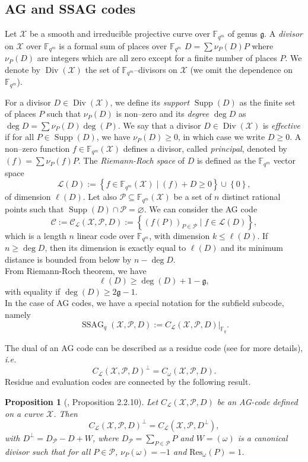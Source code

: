\documentclass[a4paper]{article}
\newtheorem{proposition}[thm]{Proposition}
\theoremstyle{definition}
\theoremstyle{remark}
\newcommand{\calP}{\mathcal{P}}
\newcommand{\calL}{\mathcal{L}}
\newcommand{\calC}{\mathcal{C}}
\newcommand{\calX}{\mathcal{X}}
\newcommand{\fqm}{\mathbb{F}_{q^m}}
\newcommand{\fq}{\mathbb{F}_{q}}
\newcommand{\set}[1]{\left\{#1\right\}}
\newcommand{\Supp}{\operatorname{Supp}}
\newcommand{\Div}{\operatorname{Div}}
\newcommand{\ssag}[1]{\operatorname{SSAG}_{q}\left(#1\right)}
\begin{document}
\subsection{AG and SSAG codes} \label{section:AG_codes}

Let $\calX$ be a smooth and irreducible projective curve over $\fqm$ of genus $\mathfrak{g}$. A \emph{divisor} on $\calX$ over $\fqm$ is a formal sum of places over $\fqm$ $D=\sum \nu_P(D) P$ where $\nu_P(D)$ are integers which are all zero except for a finite number of places $P$. We denote by $\Div(\calX)$ the set of $\fqm$--divisors on $\calX$ (we omit the dependence on $\fqm$).

For a divisor $D \in \Div(\calX)$, we define its \emph{support} $\Supp(D)$ as the finite set of places $P$ such that $\nu_P(D)$ is non--zero and its \emph{degree} $\deg D$ as $\deg D=\sum \nu_P(D) \deg(P)$. We say that a divisor $D \in \Div(\calX)$ is \emph{effective} if for all $P \in \Supp(D)$, we have $\nu_P(D) \geq 0$, in which case we write $D \geq 0$.
A non--zero function $f \in \fqm(\calX)$ defines a divisor, called \emph{principal}, denoted by $(f)=\sum \nu_P(f) P$. The \emph{Riemann-Roch space} of $D$ is defined as the $\fqm$ vector space
$$ \calL(D) := \set{f \in \fqm(\calX) \mid (f) + D \geq 0} \cup \set{0},$$
of dimension $\ell(D)$.
Let also $\calP \subseteq \fqm(\calX)$ be a set of $n$ distinct rational points such that $\Supp(D) \cap \calP = \varnothing$.
We can consider the AG code 
$$\calC := \calC_{\calL}(\calX,\calP,D) := \set{\left(f(P)\right)_{P \in \calP} \mid f \in \calL(D)},$$
which is a length $n$ linear code over $\fqm$, with dimension $k \leq \ell(D)$. If $n \geq \deg D$, then its dimension is exactly equal to $\ell(D)$ and its minimum distance is bounded from below by $n-\deg D$.\\
From Riemann-Roch theorem, we have
$$ \ell(D) \geq \deg(D) +1 - \mathfrak{g},$$ 
with equality if $\deg(D) \geq 2\mathfrak{g}-1$.\\
In the case of AG codes, we have a special notation for the subfield subcode, namely
\[\ssag{\calX,\calP,D} := C_{\calL}(\calX,\calP,D)|_{\fq}.\]

The dual of an AG code can be described as a residue code (see \cite{Sti09} for more details), \emph{i.e.}
$$ C_{\calL}(\calX,\calP,D)^{\perp} = C_{\omega}(\calX,\calP,D).$$ 
Residue and evaluation codes are connected by the following result.

\begin{proposition} [\cite{Sti09}, Proposition 2.2.10] \label{prop:dual_AG_codes}
Let $C_{\calL}(\calX,\calP,D)$ be an AG-code defined on a curve $\calX$. Then 
\[C_{\calL}(\calX,\calP,D)^{\perp} = C_{\calL}(\calX,\calP,D^{\perp}),\]
with $D^{\perp} = D_{\calP}-D+W$, where $D_{\calP} = \sum\limits_{P \in \calP} P$ and $W=(\omega)$ is a canonical divisor such that for all $P \in \calP$, $\nu_P(\omega)=-1$ and $\mathrm{Res}_{\omega}(P)=1$. 
\end{proposition}
\end{document}
